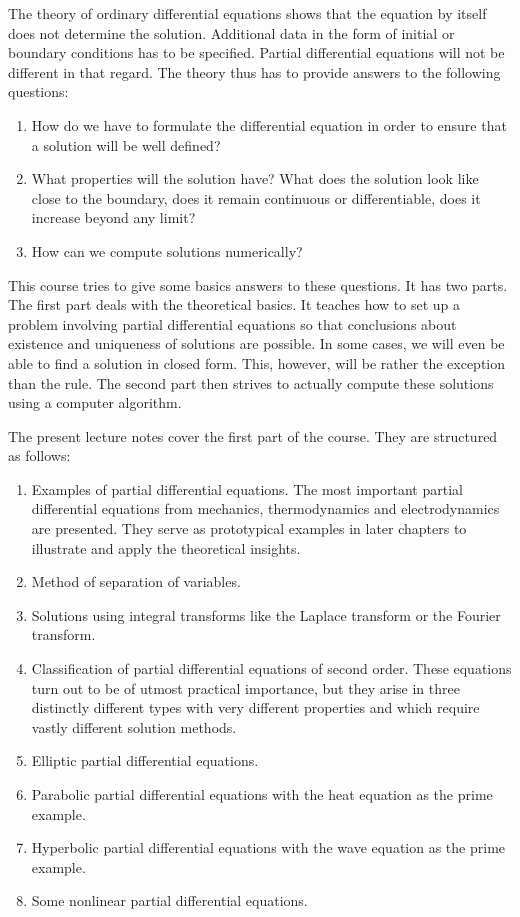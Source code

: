 The theory of ordinary differential equations shows that the equation
by itself does not determine the solution.
Additional data in the form of initial or boundary conditions has to be
specified.
Partial differential equations will not be different in that regard.
The theory thus has to provide answers to the following questions:
\begin{enumerate}
\item
How do we have to formulate the differential equation in order to ensure
that a solution will be well defined?
\item
What properties will the solution have?
What does the solution look like close to the boundary, does it remain
continuous or differentiable, does it increase beyond any limit?
\item
How can we compute solutions numerically?
\end{enumerate}
This course tries to give some basics answers to these questions.
It has two parts.
The first part deals with the theoretical basics.
It teaches how to set up a problem involving partial differential equations
so that conclusions about existence and uniqueness of solutions are possible.
In some cases, we will even be able to find a solution in closed form.
This, however, will be rather the exception than the rule.
The second part then strives to actually compute these solutions using
a computer algorithm.

The present lecture notes cover the first part of the course.
They are structured as follows:
\begin{enumerate}
\item
Examples of partial differential equations.
The most important partial differential equations from mechanics,
thermodynamics and electrodynamics are presented.
They serve as prototypical examples in later chapters to illustrate
and apply the theoretical insights.
\item
Method of separation of variables.
\item
Solutions using integral transforms like the Laplace transform or the 
Fourier transform.
\item
Classification of partial differential equations of second order.
These equations turn out to be of utmost practical importance, but
they arise in three distinctly different types with very different properties
and which require vastly different solution methods.
\item
Elliptic partial differential equations.
\item
Parabolic partial differential equations with the heat equation as the
prime example.
\item
Hyperbolic partial differential equations with the wave equation as the
prime example.
\item
Some nonlinear partial differential equations.
\end{enumerate}


